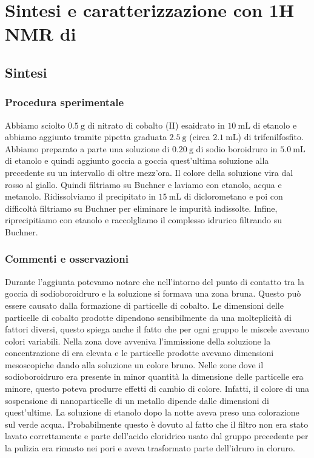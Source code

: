 \section{Sintesi e caratterizzazione con 1H NMR di }
\subsection{Sintesi}
\subsubsection{Procedura sperimentale}
Abbiamo sciolto $0.5 \mathrm{~g}$ di nitrato di cobalto (II) esaidrato in $10 \mathrm{~mL}$ di etanolo e abbiamo aggiunto tramite pipetta graduata $2.5 \mathrm{~g}$ (circa $2.1 \mathrm{~mL}$) di trifenilfosfito. Abbiamo preparato a parte una soluzione di $0.20 \mathrm{~g}$ di sodio boroidruro in $5.0 \mathrm{~mL}$ di etanolo e quindi aggiunto goccia a goccia quest'ultima soluzione alla precedente su un intervallo di oltre mezz'ora. Il colore della soluzione vira dal rosso al giallo. Quindi filtriamo su Buchner e laviamo con etanolo, acqua e metanolo. Ridissolviamo il precipitato in $15 \mathrm{~mL}$ di diclorometano e poi con difficoltà filtriamo su Buchner per eliminare le impurità indissolte. Infine, riprecipitiamo con etanolo e raccolgliamo il complesso idrurico filtrando su Buchner.
\subsubsection{Commenti e osservazioni}

Durante l'aggiunta potevamo notare che nell'intorno del punto di contatto tra la goccia di sodioboroidruro e la soluzione si formava una zona bruna. Questo può essere causato dalla formazione di particelle di cobalto\cite{cored}.
Le dimensioni delle particelle di cobalto prodotte dipendono sensibilmente da una molteplicità di fattori diversi, questo spiega anche il fatto che per ogni gruppo le miscele avevano colori variabili. Nella zona dove avveniva l'immissione della soluzione 
 la concentrazione di  era elevata e le particelle prodotte avevano dimensioni mesoscopiche dando alla soluzione un colore bruno. Nelle zone dove il sodioboroidruro era presente in minor quantità la dimensione delle particelle era minore, questo poteva produrre effetti di cambio di colore. Infatti, il colore di una sospensione di nanoparticelle di un metallo dipende dalle dimensioni di quest'ultime. 
La soluzione di etanolo dopo la notte aveva preso una colorazione sul verde acqua. Probabilmente questo è dovuto al fatto che il filtro non era stato lavato correttamente e parte dell'acido cloridrico usato dal gruppo precedente per la pulizia era rimasto nei pori e aveva trasformato parte dell'idruro in cloruro.
